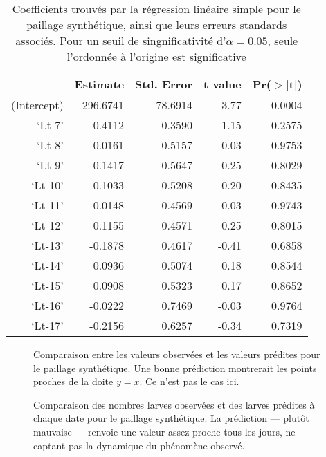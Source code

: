 \documentclass[a4paper, 11pt]{article}
\begin{document}
\begin{table}[ht]
\centering
\caption{Coefficients trouvés par la régression linéaire simple pour le paillage synthétique, ainsi que leurs erreurs standards associés. Pour un seuil de singnificativité d'$\alpha = 0.05$, seule l'ordonnée à l'origine est significative}
\label{tab:lmps}
\begin{tabular}{rrrrr}
  
 & Estimate & Std. Error & t value & Pr($>$$|$t$|$) \\ 
  \hline
(Intercept) & 296.6741 & 78.6914 & 3.77 & 0.0004 \\ 
  `Lt-7' & 0.4112 & 0.3590 & 1.15 & 0.2575 \\ 
  `Lt-8' & 0.0161 & 0.5157 & 0.03 & 0.9753 \\ 
  `Lt-9' & -0.1417 & 0.5647 & -0.25 & 0.8029 \\ 
  `Lt-10' & -0.1033 & 0.5208 & -0.20 & 0.8435 \\ 
  `Lt-11' & 0.0148 & 0.4569 & 0.03 & 0.9743 \\ 
  `Lt-12' & 0.1155 & 0.4571 & 0.25 & 0.8015 \\ 
  `Lt-13' & -0.1878 & 0.4617 & -0.41 & 0.6858 \\ 
  `Lt-14' & 0.0936 & 0.5074 & 0.18 & 0.8544 \\ 
  `Lt-15' & 0.0908 & 0.5323 & 0.17 & 0.8652 \\ 
  `Lt-16' & -0.0222 & 0.7469 & -0.03 & 0.9764 \\ 
  `Lt-17' & -0.2156 & 0.6257 & -0.34 & 0.7319 
\end{tabular}
\end{table}

\begin{figure}[ht]
 \centering
 \caption{Comparaison entre les valeurs observées et les valeurs prédites pour le paillage synthétique. Une bonne prédiction montrerait les points proches de la doite $y=x$. Ce n'est pas le cas ici.}
 \label{fig:lmps1}
\end{figure}

\begin{figure}[ht]
 \centering
 \caption{Comparaison des nombres larves observées et des larves prédites à chaque date pour le paillage synthétique. La prédiction --- plutôt mauvaise --- renvoie une valeur assez proche tous les jours, ne captant  pas la dynamique du phénomène observé.}
 \label{fig:lmps2}
\end{figure}
\end{document}
